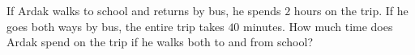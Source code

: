 If Ardak walks to school and returns by bus, he spends $2$ hours on the trip. If he goes both ways by bus, the entire trip takes $40$ minutes. How much time does Ardak spend on the trip if he walks both to and from school?
